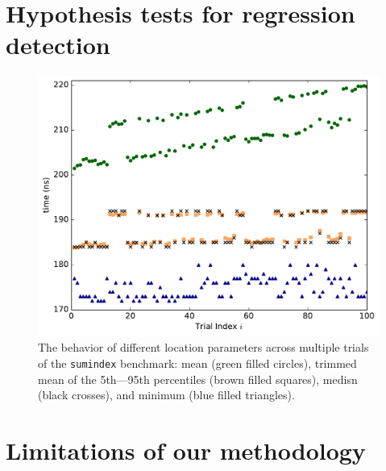 \documentclass[conference]{IEEEtran}
\begin{document}
\label{sec:hypotesting}
\section{Hypothesis tests for regression detection}

\begin{figure}
\centering
\includegraphics[width=\columnwidth]{figures/fig3/location_estimators_sumindex}
\caption{The behavior of different location parameters across multiple trials of
the \lstinline|sumindex| benchmark: mean (green filled circles), trimmed mean of
the 5th---95th percentiles (brown filled squares), medisn (black crosses), and
minimum (blue filled triangles).}
\label{fig:locationmeasures}
\end{figure}

\label{sec:limits}
\section{Limitations of our methodology}
\end{document}
